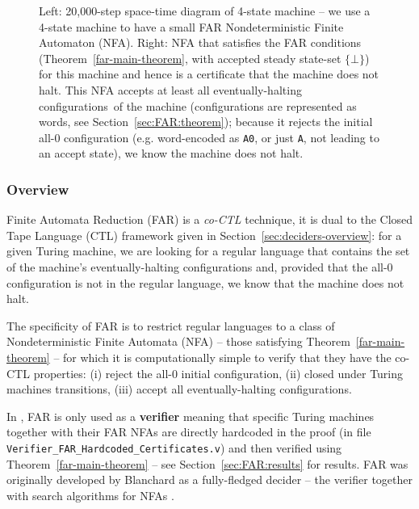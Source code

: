 \begin{figure}[h]
\begin{subfigure}[t]{0.5\textwidth}
        \label{fig:far_nfa}
    \end{subfigure}
    \caption[Short caption]{{\small Left: 20,000-step space-time diagram of 4-state machine  -- we use a 4-state machine to have a small FAR Nondeterministic Finite Automaton (NFA). Right: NFA that satisfies the FAR conditions (Theorem~\ref{far-main-theorem}, with accepted steady state-set $\{\bot\}$) for this machine and hence is a certificate that the machine does not halt. This NFA accepts at least all eventually-halting configurations\footnotemark ~of the machine (configurations are represented as words, see Section~\ref{sec:FAR:theorem}); because it rejects the initial all-0 configuration (e.g. word-encoded as \texttt{A0}, or just \texttt{A}, not leading to an accept state), we know the machine does not halt.}}
    \label{fig:finite-automata-reduction}
\end{figure}

\vspace{-1em}
\subsubsection{Overview}

\newcommand{\M}{M}
\newcommand{\T}{^{T}}

Finite Automata Reduction (FAR) is a \textit{co-CTL} technique, \ie it is dual to the Closed Tape Language (CTL) framework given in Section~\ref{sec:deciders-overview}: for a given Turing machine, we are looking for a regular language that contains the set of the machine's eventually-halting configurations and, provided that the all-0 configuration is not in the regular language, we know that the machine does not halt.

The specificity of FAR is to restrict regular languages to a class of Nondeterministic Finite Automata (NFA) -- those satisfying Theorem~\ref{far-main-theorem} -- for which it is computationally simple to verify that they have the co-CTL properties: (i) reject the all-0 initial configuration, (ii) closed under Turing machines transitions, (iii) accept all eventually-halting configurations.

In \CoqBB, FAR is only used as a \textbf{verifier} meaning that specific Turing machines together with their FAR NFAs are directly hardcoded in the proof (in file \texttt{Verifier\_FAR\_Hardcoded\_Certificates.v}) and then verified using Theorem~\ref{far-main-theorem} -- see Section~\ref{sec:FAR:results} for results. FAR was originally developed by Blanchard as a fully-fledged decider -- \ie the verifier together with search algorithms for NFAs \cite{FAR}.

